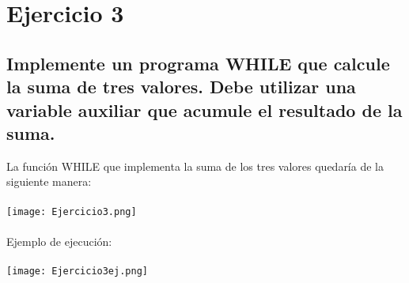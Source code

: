 \documentclass{article}
\begin{document}
\section*{Ejercicio 3}
\subsection*{Implemente un programa WHILE que calcule la suma de tres valores. Debe utilizar una variable auxiliar que acumule el resultado de la suma.}
La función WHILE que implementa la suma de los tres valores quedaría de la siguiente manera:
\\
\\ \texttt{[image: Ejercicio3.png]}
\\
\\ Ejemplo de ejecución:
\\
\\ \texttt{[image: Ejercicio3ej.png]}
\end{document}
